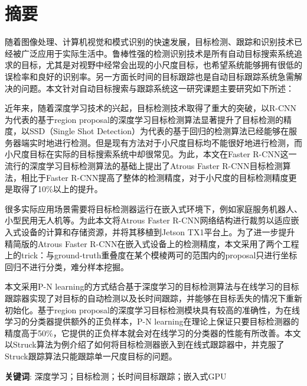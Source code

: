 \newpage
{}



\chapter*{摘要}

\hspace*{0.85cm}随着图像处理、计算机视觉和模式识别的快速发展，目标检测、跟踪和识别技术已经被广泛应用于实际生活中。鲁棒性强的检测识别技术是所有自动目标搜索系统追求的目标，尤其是对视野中经常会出现的小尺度目标，也希望系统能够拥有很低的误检率和良好的识别率。另一方面长时间的目标跟踪也是自动目标跟踪系统急需解决的问题。本文针对自动目标搜索与跟踪系统这一研究课题主要研究如下所述：

近年来，随着深度学习技术的兴起，目标检测技术取得了重大的突破，以R-CNN为代表的基于region proposal的深度学习目标检测算法显著提升了目标检测的精度，以SSD（Single Shot Detection）为代表的基于回归的检测算法已经能够在服务器端实时地进行检测。但是现有方法对于小尺度目标均不能很好地进行检测，而小尺度目标在实际的目标搜索系统中却很常见。为此，本文在Faster R-CNN这一流行的深度学习目标检测算法的基础上提出了Atrous Faster R-CNN目标检测算法，相比于Faster R-CNN提高了整体的检测精度，对于小尺度的目标检测精度更是取得了10\%以上的提升。

很多实际应用场景需要将目标检测器运行在嵌入式环境下，例如家庭服务机器人、小型民用无人机等。为此本文将Atrous Faster R-CNN网络结构进行裁剪以适应嵌入式设备的计算和存储资源，并将其移植到Jetson TX1平台上。为了进一步提升精简版的Atrous Faster R-CNN在嵌入式设备上的检测精度，本文采用了两个工程上的trick：与ground-truth重叠度在某个模棱两可的范围内的proposal只进行坐标回归不进行分类，难分样本挖掘。

本文采用P-N learning的方式结合基于深度学习的目标检测算法与在线学习的目标跟踪器实现了对目标的自动检测以及长时间跟踪，并能够在目标丢失的情况下重新初始化。基于region proposal的深度学习目标检测模块具有较高的准确性，为在线学习的分类器提供额外的正负样本，P-N learning在理论上保证只要目标检测器的精度高于50\%，它提供的正负样本就会对在线学习的分类器的性能有所改善。本文以Struck算法为例介绍了如何将目标检测器嵌入到在线式跟踪器中，并克服了Struck跟踪算法只能跟踪单一尺度目标的问题。

\vskip 0.3cm \textbf{关键词}: 深度学习；目标检测；长时间目标跟踪；嵌入式GPU
\newpage
